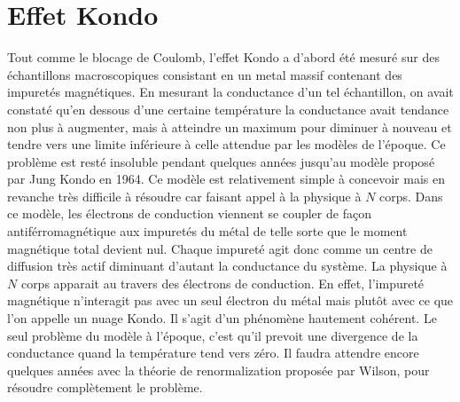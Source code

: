 

\section{Effet Kondo}

Tout comme le blocage de Coulomb, l'effet Kondo a d'abord été mesuré sur des échantillons macroscopiques consistant en un metal massif contenant des impuretés magnétiques. En mesurant la conductance d'un tel échantillon, on avait constaté  qu'en dessous d'une certaine température la conductance avait tendance non plus à augmenter, mais à atteindre un maximum pour diminuer à nouveau et tendre vers une limite inférieure à celle attendue par les modèles de l'époque. Ce problème est resté insoluble pendant quelques années jusqu'au modèle proposé par Jung Kondo en 1964. Ce modèle est relativement simple à concevoir mais en revanche très difficile à résoudre car faisant appel à la physique à $N$ corps. Dans ce modèle, les électrons de conduction viennent se coupler de façon antiférromagnétique aux impuretés du métal de telle sorte que le moment magnétique total devient nul. Chaque impureté agit donc comme un centre de diffusion très actif diminuant d'autant la conductance du système. La physique à $N$ corps apparait au travers des électrons de conduction. En effet, l'impureté magnétique n'interagit pas avec un seul électron du métal mais plutôt avec ce que l'on appelle un nuage Kondo. Il s'agit d'un phénomène hautement cohérent. Le seul problème du modèle à l'époque, c'est qu'il prevoit une divergence de la conductance quand la température tend vers zéro. Il faudra attendre encore quelques années avec la théorie de renormalization proposée par Wilson, pour résoudre complètement le problème.

